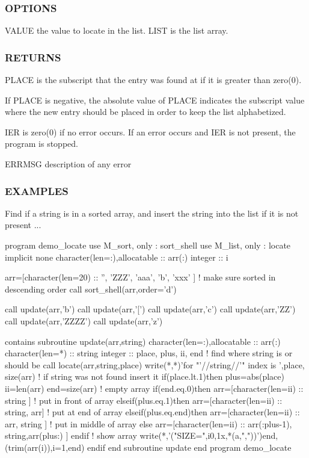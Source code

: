 \subsubsection*{O\+P\+T\+I\+O\+NS}

\begin{DoxyVerb}VALUE         the value to locate in the list.
LIST          is the list array.
\end{DoxyVerb}


\subsubsection*{R\+E\+T\+U\+R\+NS}

P\+L\+A\+CE is the subscript that the entry was found at if it is greater than zero(0).

If P\+L\+A\+CE is negative, the absolute value of P\+L\+A\+CE indicates the subscript value where the new entry should be placed in order to keep the list alphabetized.

I\+ER is zero(0) if no error occurs. If an error occurs and I\+ER is not present, the program is stopped.

E\+R\+R\+M\+SG description of any error

\subsubsection*{E\+X\+A\+M\+P\+L\+ES}

\begin{DoxyVerb}Find if a string is in a sorted array, and insert the string into
the list if it is not present ...

 program demo_locate
 use M_sort, only : sort_shell
 use M_list, only : locate
 implicit none
 character(len=:),allocatable  :: arr(:)
 integer                       :: i

 arr=[character(len=20) :: '', 'ZZZ', 'aaa', 'b', 'xxx' ]
 ! make sure sorted in descending order
 call sort_shell(arr,order='d')

 call update(arr,'b')
 call update(arr,'[')
 call update(arr,'c')
 call update(arr,'ZZ')
 call update(arr,'ZZZZ')
 call update(arr,'z')

 contains
 subroutine update(arr,string)
 character(len=:),allocatable :: arr(:)
 character(len=*)             :: string
 integer                      :: place, plus, ii, end
 ! find where string is or should be
 call locate(arr,string,place)
 write(*,*)'for "'//string//'" index is ',place, size(arr)
 ! if string was not found insert it
 if(place.lt.1)then
    plus=abs(place)
    ii=len(arr)
    end=size(arr)
    ! empty array
    if(end.eq.0)then
       arr=[character(len=ii) :: string ]
    ! put in front of array
    elseif(plus.eq.1)then
       arr=[character(len=ii) :: string, arr]
    ! put at end of array
    elseif(plus.eq.end)then
       arr=[character(len=ii) :: arr, string ]
    ! put in middle of array
    else
       arr=[character(len=ii) :: arr(:plus-1), string,arr(plus:) ]
    endif
    ! show array
    write(*,'("SIZE=",i0,1x,*(a,","))')end,(trim(arr(i)),i=1,end)
 endif
 end subroutine update
 end program demo_locate
\end{DoxyVerb}


